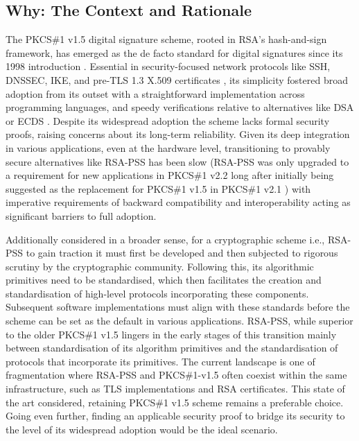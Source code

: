 \documentclass[]{final_report}
\theoremstyle{definition}
\begin{document}
\subsection{Why: The Context and Rationale}
The PKCS\#1 v1.5 digital signature scheme, rooted in RSA's hash-and-sign framework, has emerged as the de facto standard for digital signatures since its 1998 introduction \cite{rfc2313}. Essential in security-focused network protocols like SSH, DNSSEC, IKE, and pre-TLS 1.3 X.509 certificates \cite{schaad2005additional}, its simplicity fostered broad adoption from its outset with a straightforward implementation across programming languages, and speedy verifications relative to alternatives like DSA or ECDS  \cite{jager2018security}. 
Despite its widespread adoption the scheme lacks formal security proofs, raising concerns about its long-term reliability.
Given its deep integration in various applications, even at the hardware level, transitioning to provably secure \cite{bellare1996exact, jonsson2001security} alternatives like RSA-PSS has been slow (RSA-PSS was only upgraded to a requirement for new applications in PKCS\#1 v2.2 \cite{rfc8017} long after initially being suggested as the replacement for PKCS\#1 v1.5 in PKCS\#1 v2.1 \cite{rfc3447}) with imperative requirements of backward compatibility and interoperability acting as significant barriers to full adoption.

Additionally considered in a broader sense, for a cryptographic scheme i.e., RSA-PSS to gain traction it must first be developed and then subjected to rigorous scrutiny by the cryptographic community. Following this, its algorithmic primitives need to be standardised, which then facilitates the creation and standardisation of high-level protocols incorporating these components. Subsequent software implementations must align with these standards before the scheme can be set as the default in various applications. RSA-PSS, while superior to the older PKCS\#1 v1.5 lingers in the early stages of this transition mainly between standardisation of its algorithm primitives and the standardisation of protocols that incorporate its primitives. The current landscape is one of fragmentation where RSA-PSS and PKCS\#1-v1.5 often coexist within the same infrastructure, such as TLS implementations and RSA certificates. This state of the art considered, retaining PKCS\#1 v1.5 scheme remains a preferable choice. Going even further, finding an applicable security proof to bridge its security to the level of its widespread adoption would be the ideal scenario.
\end{document}
